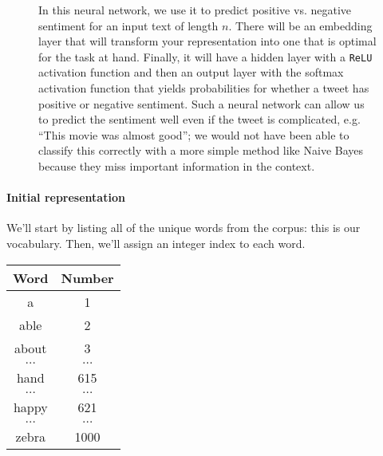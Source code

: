 \documentclass[12pt]{article}
\begin{document}
\begin{figure}[h]
  \caption{In this neural network, we use it to predict positive vs. negative sentiment for an input text of length $n$. There will be an embedding layer that will transform your representation into one that is optimal for the task at hand. Finally, it will have a hidden layer with a \texttt{ReLU} activation function and then an output layer with the softmax activation function that yields probabilities for whether a tweet has positive or negative sentiment. Such a neural network can allow us to predict the sentiment well even if the tweet is complicated, e.g. ``This movie was almost good''; we would not have been able to classify this correctly with a more simple method like Naive Bayes because they miss important information in the context.}
\end{figure}

\paragraph{Initial representation} We'll start by listing all of the unique words from the corpus: this is our vocabulary. Then, we'll assign an integer index to each word.

\begin{table}[h]
  \begin{center}
    \begin{tabular}{c c}
      \hline
      Word & Number \\
      \hline
      a & 1 \\
      able & 2 \\
      about & 3 \\
      $\ldots$ & $\ldots$ \\
      hand & 615 \\
      $\ldots$ & $\ldots$ \\      
      happy & 621 \\
      $\ldots$ & $\ldots$ \\
      zebra & 1000 \\
      \hline
    \end{tabular}
  \end{center}
\end{table}
\end{document}
